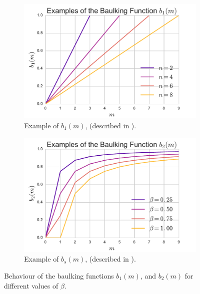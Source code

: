 \documentclass{article}
\begin{document}
\begin{figure}[!hbtp]
    \begin{center}
    \begin{subfigure}[b]{0.45\textwidth}
        \includegraphics[width=\textwidth]{img/examplebaulking1.pdf}
        \caption{Example of $b_1(m)$, (described in \cite{anckerjrgafarian63a}).}
        \label{fig:varyLambdabybeta}
    \end{subfigure}
    \begin{subfigure}[b]{0.45\textwidth}
        \includegraphics[width=\textwidth]{img/examplebaulking2.pdf}
        \caption{Example of $b_s(m)$, (described in \cite{anckerjrgafarian63b}).}
        \label{fig:varybetabyLambda}
    \end{subfigure}
    \end{center}
    \caption{Behaviour of the baulking functions $b_1(m)$, and $b_2(m)$ for different values of $\beta$.}
    \label{fig:examplebaulkingfunctions}
\end{figure}
\end{document}
